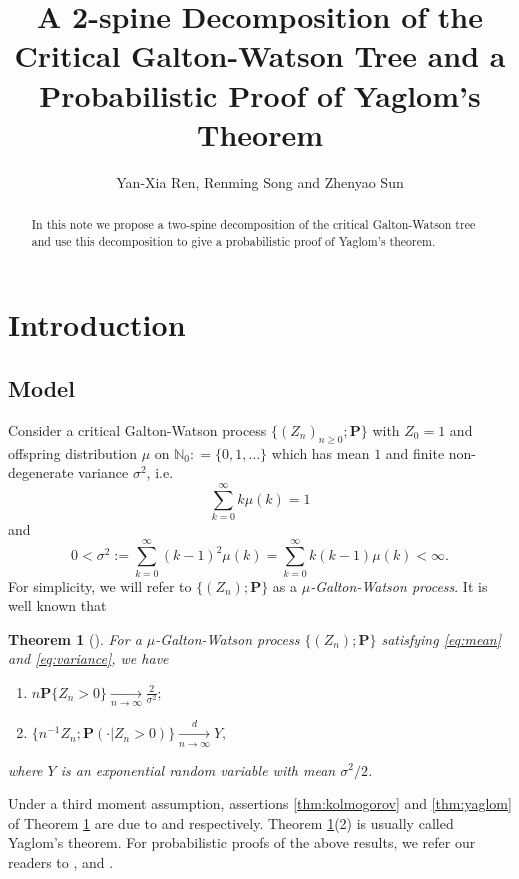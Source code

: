 \documentclass[12pt,a4paper]{amsart}
\title[A 2-spine decomposition and Yaglom's theorem]
{\large A 2-spine Decomposition of the Critical Galton-Watson Tree and a Probabilistic Proof of Yaglom's Theorem}
\author{Yan-Xia Ren, Renming Song and Zhenyao Sun}
\newtheorem{thm}{Theorem}[section]
\numberwithin{equation}{section}
\begin{document}
\begin{abstract}
	In this note  we propose a two-spine decomposition of the critical Galton-Watson tree and use this decomposition to give a probabilistic proof of Yaglom's theorem.
\end{abstract}
\maketitle	
\section{Introduction}
\subsection{Model}
\label{sec:model}
	Consider a critical Galton-Watson process $\{(Z_n)_{n\ge 0}; \mathbf P \}$ with $Z_0 = 1$ and offspring distribution $\mu$ on $\mathbb N_0 : = \{0,1,\dots\}$ which has mean $1$ and finite non-degenerate variance $\sigma^2$, i.e.
\begin{equation}\label{eq:mean}
 \sum_{k=0}^\infty k \mu(k)	=1
\end{equation}
	and
\begin{equation}\label{eq:variance}
	0	
	<	\sigma^2
	:=	\sum_{k=0}^\infty  (k-1)^2 \mu(k)
	=	\sum_{k=0}^\infty k(k-1) \mu(k)
	<	\infty.
\end{equation}
	For simplicity, we will refer to $\{(Z_n); \mathbf P\}$ as  a  \emph{$\mu$-Galton-Watson process}. 
	It is well known that
\begin{thm}[\cite{kesten1966galton}] \label{thm: Kolmogrov and Yaglom theorem}
	For a $\mu$-Galton-Watson process $\{(Z_n); \mathbf P\}$ satisfying \eqref{eq:mean} and \eqref{eq:variance}, we have
\begin{enumerate}
\item \label{thm:kolmogorov}
	$n \mathbf P \{Z_n>0\} \xrightarrow[n \to \infty]{} \frac{2}{\sigma^2};$ 
\item \label{thm:yaglom}
	$\{n^{-1}Z_n; \mathbf P(\cdot | Z_n>0)\}\xrightarrow[n \to \infty]{d} Y,$
\end{enumerate}
	where $Y$ is an exponential random variable with mean $\sigma^2/2$.
\end{thm}

	Under a third moment assumption, assertions \eqref{thm:kolmogorov} and \eqref{thm:yaglom} of Theorem \ref{thm: Kolmogrov and Yaglom theorem} are due to \cite{kolmogorov1938losung} and \cite{yaglom1947certain} respectively. 
	Theorem \ref{thm: Kolmogrov and Yaglom theorem}(2) is usually called Yaglom's theorem.
	For probabilistic proofs of the above results, we refer our readers to 
\cite{geiger1999elementary}, \cite{geiger2000new} and \cite{lyons1995conceptual}.
\end{document}
